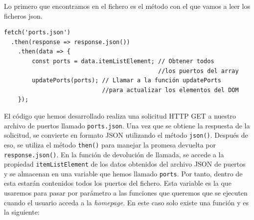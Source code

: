 \documentclass{article}
\begin{document}
\noindent Lo primero que encontramos en el fichero es el método con el que vamos a leer los ficheros json.
\begin{verbatim}
fetch('ports.json')
  .then(response => response.json())
    .then(data => {
        const ports = data.itemListElement; // Obtener todos 
                                            //los puertos del array
        updatePorts(ports); // Llamar a la función updatePorts 
                            //para actualizar los elementos del DOM
    });
\end{verbatim}
El código que hemos desarrollado realiza una solicitud HTTP GET a nuestro archivo de puertos llamado \texttt{ports.json}. Una vez que se obtiene la respuesta de la solicitud, se convierte en formato JSON utilizando el método \texttt{json()}. Después de eso, se utiliza el método \texttt{then()} para manejar la promesa devuelta por \texttt{response.json()}. En la función de devolución de llamada, se accede a la propiedad \texttt{itemListElement} de los datos obtenidos del archivo JSON de puertos y se almacenan en una variable que hemos llamado \texttt{ports}. Por tanto, dentro de esta estarán contenidos todos los puertos del fichero. Esta variable es la que usaremos para pasar por parámetro a las funciones que queremos que se ejecuten cuando el usuario acceda a la \textit{homepage}. En este caso solo existe una función y es la siguiente:
\end{document}
